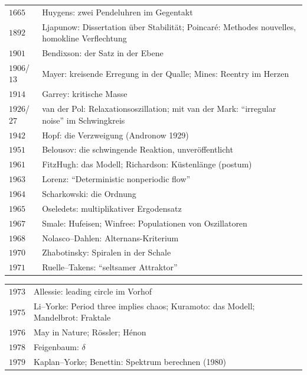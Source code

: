 \begin{merksatz}
\begin{center}
{\small
\renewcommand{\arraystretch}{1.42}
\begin{tabular}{@{}P{1.2cm}P{7.4cm}@{}}
\toprule
$1665$ & Huygens: zwei Pendeluhren im Gegentakt\\
$1892$ & Ljapunow: Dissertation über Stabilität; Poincaré: Methodes nouvelles, homokline Verflechtung\\
$1901$ & Bendixson: der Satz in der Ebene\\
$1906$/$13$ & Mayer: kreisende Erregung in der Qualle; Mines: Reentry im Herzen\\
$1914$ & Garrey: kritische Masse\\
$1926$/$27$ & van der Pol: Relaxationsoszillation; mit van der Mark: \enquote{irregular noise} im Schwingkreis\\
$1942$ & Hopf: die Verzweigung (Andronow 1929)\\
$1951$ & Belousov: die schwingende Reaktion, unveröffentlicht\\
$1961$ & FitzHugh: das Modell; Richardson: Küstenlänge (postum)\\
$1963$ & Lorenz: \enquote{Deterministic nonperiodic flow}\\
$1964$ & Scharkowski: die Ordnung\\
$1965$ & Oseledets: multiplikativer Ergodensatz\\
$1967$ & Smale: Hufeisen; Winfree: Populationen von Oszillatoren\\
$1968$ & Nolasco--Dahlen: Alternans-Kriterium\\
$1970$ & Zhabotinsky: Spiralen in der Schale\\
$1971$ & Ruelle--Takens: \enquote{seltsamer Attraktor}\\
\bottomrule
\end{tabular}}
\end{center}
\begin{center}
{\small
\renewcommand{\arraystretch}{1.42}
\begin{tabular}{@{}P{1.2cm}P{7.4cm}@{}}
\toprule
$1973$ & Allessie: leading circle im Vorhof\\
$1975$ & Li--Yorke: Period three implies chaos; Kuramoto: das Modell; Mandelbrot: Fraktale\\
$1976$ & May in Nature; Rössler; Hénon\\
$1978$ & Feigenbaum: $\delta$\\
$1979$ & Kaplan--Yorke; Benettin: Spektrum berechnen (1980)\\

\end{tabular}}
\end{center}
\end{merksatz}
